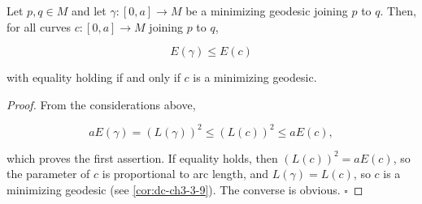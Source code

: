 \begin{lemma}
  \label{lem:dc-ch9-2-3}
  Let $p,q\in M$ and let $\gamma:[0,a]\to M$ be a minimizing geodesic joining $p$ to
  $q$. Then, for all curves $c:[0,a]\to M$ joining $p$ to $q$,
  
  $$
  E(\gamma)\le E(c)
  $$
  
  with equality holding if and only if $c$ is a minimizing geodesic.
\end{lemma}
\begin{proof}
  From the considerations above,
  
  $$
  aE(\gamma)=(L(\gamma))^2\le(L(c))^2\le aE(c),
  $$
  
  which proves the first assertion. If equality holds, then $(L(c))^2=aE(c)$, so the
  parameter of $c$ is proportional to arc length, and $L(\gamma)=L(c)$, so $c$ is a
  minimizing geodesic (see \cref{cor:dc-ch3-3-9}). The converse is obvious.
  $\square$
\end{proof}

